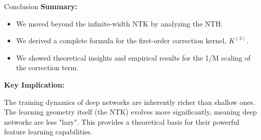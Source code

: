 \documentclass{beamer}
\begin{document}
\begin{frame}{Conclusion}
\textbf{Summary:}
\begin{itemize}
    \item We moved beyond the infinite-width NTK by analyzing the NTH.
    \item We derived a complete formula for the first-order correction kernel, $K^{(3)}$.
    \item We showed theoretical insights and empirical results for the 1/M scaling of the correction term.
\end{itemize}
\vspace{1cm}
\textbf{Key Implication:}
\begin{alertblock}
The training dynamics of deep networks are inherently richer than shallow ones. The learning geometry itself (the NTK) evolves more significantly, meaning deep networks are less "lazy". This provides a theoretical basis for their powerful feature learning capabilities.
\end{alertblock}
\end{frame}
\end{document}
